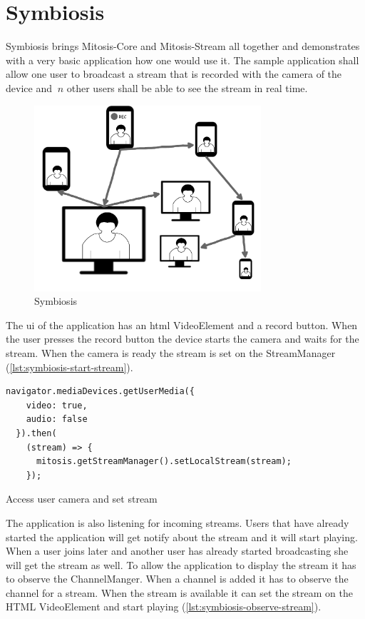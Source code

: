 \section{Symbiosis}
Symbiosis brings Mitosis-Core and Mitosis-Stream all together and demonstrates with a very basic application how one would use it.
The sample application shall allow one user to broadcast a stream that is recorded with the camera of the device and $\ n $ other users shall be able to see the stream in real time.

\begin{figure}
\centering
\includegraphics[width=0.75\textwidth]{graphics/implementation/symbiosis.pdf}
\caption{Symbiosis}
\label{fig:symbiosis-implementation}
\end{figure}

The \gls{ui} of the application has an \gls{html} VideoElement and a record button. When the user presses the record button the device starts the camera and waits for the stream. When the camera is ready the stream is set on the StreamManager (\vref{lst:symbiosis-start-stream}).

\begin{Listing}
\begin{lstlisting}
navigator.mediaDevices.getUserMedia({
    video: true,
    audio: false
  }).then(
    (stream) => {
      mitosis.getStreamManager().setLocalStream(stream);
    });
\end{lstlisting}
\caption{Access user camera and set stream}
\label{lst:symbiosis-start-stream}
\end{Listing}

The application is also listening for incoming streams. Users that have already started the application will get notify about the stream and it will start playing. When a user joins later and another user has already started broadcasting she will get the stream as well.
To allow the application to display the stream it has to observe the ChannelManger. When a channel is added it has to observe the channel for a stream. When the stream is available it can set the stream on the HTML VideoElement and start playing (\vref{lst:symbiosis-observe-stream}).

